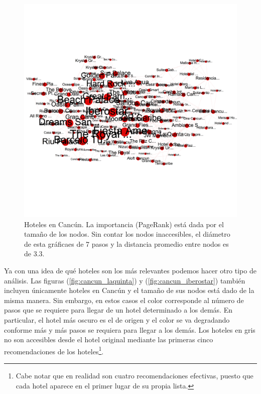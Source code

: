 \documentclass[12pt]{report}
\begin{document}
\begin{figure}[ht]
	\centering
	\includegraphics[height=0.80\textwidth, angle=90,
		trim = 0 800 0 800, clip]{imagenes/cancun.png}
	\caption{\label{fig:cancun} Hoteles en Cancún. La importancia (PageRank) está dada por el tamaño de los nodos. Sin contar los nodos inaccesibles, el diámetro de esta gráficaes de 7 pasos y la distancia promedio entre nodos es de 3.3.}
\end{figure}

Ya con una idea de qué hoteles son los más relevantes podemos hacer otro tipo de análisis. Las figuras (\ref{fig:cancun_laquinta}) y (\ref{fig:cancun_iberostar}) también incluyen únicamente hoteles en Cancún y el tamaño de sus nodos está dado de la misma manera. Sin embargo, en estos casos el color corresponde al número de pasos que se requiere para llegar de un hotel determinado a los demás. En particular, el hotel más oscuro es el de origen y el color se va degradando conforme más y más pasos se requiera para llegar a los demás. Los hoteles en gris no son accesibles desde el hotel original mediante las primeras cinco recomendaciones de los hoteles\footnote{Cabe notar que en realidad son cuatro recomendaciones efectivas, puesto que cada hotel aparece en el primer lugar de su propia lista.}.
\end{document}

